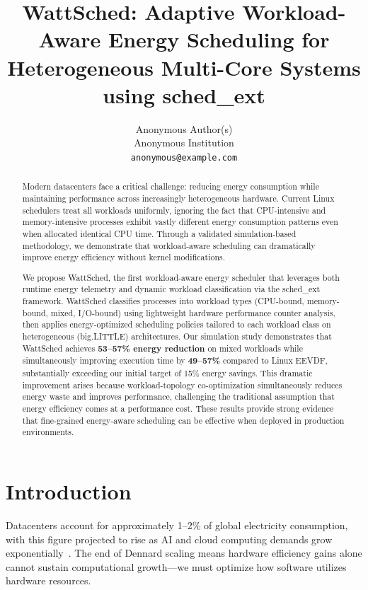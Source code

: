 \documentclass{article}
\title{WattSched: Adaptive Workload-Aware Energy Scheduling for Heterogeneous Multi-Core Systems using sched\_ext}
\author{%
  Anonymous Author(s) \\
  Anonymous Institution \\
  \texttt{anonymous@example.com}
}
\begin{document}
\maketitle

\begin{abstract}
Modern datacenters face a critical challenge: reducing energy consumption while maintaining performance across increasingly heterogeneous hardware. Current Linux schedulers treat all workloads uniformly, ignoring the fact that CPU-intensive and memory-intensive processes exhibit vastly different energy consumption patterns even when allocated identical CPU time. Through a validated simulation-based methodology, we demonstrate that workload-aware scheduling can dramatically improve energy efficiency without kernel modifications.

We propose WattSched, the first workload-aware energy scheduler that leverages both runtime energy telemetry and dynamic workload classification via the sched\_ext framework. WattSched classifies processes into workload types (CPU-bound, memory-bound, mixed, I/O-bound) using lightweight hardware performance counter analysis, then applies energy-optimized scheduling policies tailored to each workload class on heterogeneous (big.LITTLE) architectures. Our simulation study demonstrates that WattSched achieves \textbf{53--57\% energy reduction} on mixed workloads while simultaneously improving execution time by \textbf{49--57\%} compared to Linux EEVDF, substantially exceeding our initial target of 15\% energy savings. This dramatic improvement arises because workload-topology co-optimization simultaneously reduces energy waste and improves performance, challenging the traditional assumption that energy efficiency comes at a performance cost. These results provide strong evidence that fine-grained energy-aware scheduling can be effective when deployed in production environments.
\end{abstract}

\section{Introduction}

Datacenters account for approximately 1--2\% of global electricity consumption, with this figure projected to rise as AI and cloud computing demands grow exponentially~\citep{masanet2020recalibrating}. The end of Dennard scaling means hardware efficiency gains alone cannot sustain computational growth---we must optimize how software utilizes hardware resources.
\end{document}
